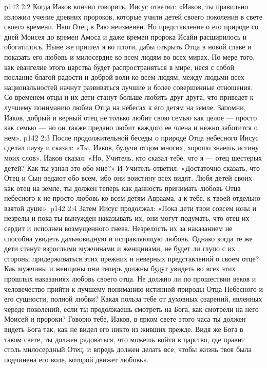\vs p142 2:2 \pc Когда Иаков кончил говорить, Иисус ответил: «Иаков, ты правильно изложил учение древних пророков, которые учили детей своего поколения в свете своего времени. Наш Отец в Раю неизменен. Но представление о его природе со дней Моисея до времен Амоса и даже времен пророка Исайи расширилось и обогатилось. Ныне же пришел я во плоти, дабы открыть Отца в новой славе и показать его любовь и милосердие ко всем людям во всех мирах. По мере того, как евангелие этого царства будет распространяться в мире, неся с собой послание благой радости и доброй воли ко всем людям, между людьми всех национальностей начнут развиваться лучшие и более совершенные отношения. Со временем отцы и их дети станут больше любить друг друга, что приведет к лучшему пониманию любви Отца на небесах к его детям на земле. Запомни, Иаков, добрый и верный отец не только любит свою семью как целое --- просто как семью --- но он также предано любит каждого ее  члена и нежно заботится о нем».
\vs p142 2:3 После продолжительной беседы о природе Отца небесного Иисус сделал паузу и сказал: «Ты, Иаков, будучи отцом многих, хорошо знаешь истину моих слов». Иаков сказал: «Но, Учитель, кто сказал тебе, что я --- отец шестерых детей? Как ты узнал это обо мне?» И Учитель ответил: «Достаточно сказать, что Отец и Сын ведают обо всем, ибо они воистину всех видят. Любя детей своих как отец на земле, ты должен теперь как данность принимать любовь Отца небесного к  не просто любовь ко всем детям Авраама, а к тебе, к твоей отдельно взятой душе».
\vs p142 2:4 \pc Затем Иисус продолжал: «Пока дети твои совсем юны и незрелы и пока ты вынужден наказывать их, они могут подумать, что отец их сердит и исполнен возмущенного гнева. Незрелость их за наказанием не способна увидеть дальновидную и исправляющую любовь. Однако когда те же дети станут взрослыми мужчинами и женщинами, не будет ли глупо с их стороны придерживаться этих прежних и неверных представлений о своем отце? Как мужчины и женщины они теперь должны будут увидеть во всех этих прошлых наказаниях любовь своего отца. Не должно ли по прошествии веков и человечество прийти к лучшему пониманию истинной природы Отца Небесного и его сущности, полной любви? Какая польза тебе от духовных озарений, явленных череде поколений, если ты продолжаешь смотреть на Бога, как смотрели на него Моисей и пророки? Говорю тебе, Иаков, в ярком свете этого часа ты должен видеть Бога так, как не видел его никто из живших прежде. Видя же Бога в таком свете, ты должен радоваться, что можешь войти в царство, где правит столь милосердный Отец, и впредь должен делать все, чтобы жизнь твоя была подчинена его воле, которой движет любовь».
